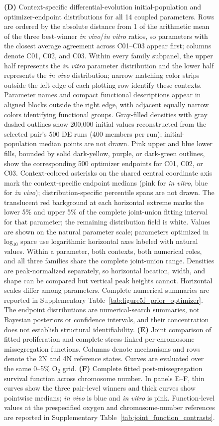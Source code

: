 \documentclass[11pt]{article}
\begin{document}
\begin{figure}[!htbp]
{\textbf{(D)} Context-specific differential-evolution initial-population and optimizer-endpoint distributions for all 14 coupled parameters. Rows are ordered by the absolute distance from 1 of the arithmetic mean of the three best-winner \textit{in vivo}/\textit{in vitro} ratios, so parameters with the closest average agreement across C01--C03 appear first; columns denote C01, C02, and C03. Within every family subpanel, the upper half represents the \textit{in vitro} parameter distribution and the lower half represents the \textit{in vivo} distribution; narrow matching color strips outside the left edge of each plotting row identify these contexts. Parameter names and compact functional descriptions appear in aligned blocks outside the right edge, with adjacent equally narrow colors identifying functional groups. Gray-filled densities with gray dashed outlines show 200,000 initial values reconstructed from the selected pair's 500 DE runs (400 members per run); initial-population median points are not drawn. Pink upper and blue lower fills, bounded by solid dark-yellow, purple, or dark-green outlines, show the corresponding 500 optimizer endpoints for C01, C02, or C03. Context-colored asterisks on the shared central coordinate axis mark the context-specific endpoint medians (pink for \textit{in vitro}, blue for \textit{in vivo}); distribution-specific percentile spans are not drawn. The translucent red background at each horizontal extreme marks the lower 5\% and upper 5\% of the complete joint-union fitting interval for that parameter; the remaining distribution field is white. Values are shown on the natural parameter scale; parameters optimized in log$_{10}$ space use logarithmic horizontal axes labeled with natural values. Within a parameter, both contexts, both numerical roles, and all three families share the complete joint-union range. Densities are peak-normalized separately, so horizontal location, width, and shape can be compared but vertical peak heights cannot. Horizontal scales differ among parameters. Complete numerical summaries are reported in Supplementary Table~\ref{tab:figure5f_prior_optimizer}. The endpoint distributions are numerical-search summaries, not Bayesian posteriors or confidence intervals, and their concentration does not establish structural identifiability.
\textbf{(E)} Joint comparison of fitted proliferation and complete stress-linked per-chromosome missegregation functions. Columns denote mechanisms and rows denote the 2N and 4N reference states. Curves are evaluated over the same 0--5\% O$_2$ grid.
\textbf{(F)} Complete fitted post-missegregation survival function across chromosome number. In panels E--F, thin curves show the three pair-level winners and thick curves show pointwise medians; \textit{in vivo} is blue and \textit{in vitro} is pink. Function-level values at the prespecified oxygen and chromosome-number references are reported in Supplementary Table~\ref{tab:joint_function_contrasts}.}
\label{fig:iteration1-joint-context-differences}
\end{figure}
\end{document}
